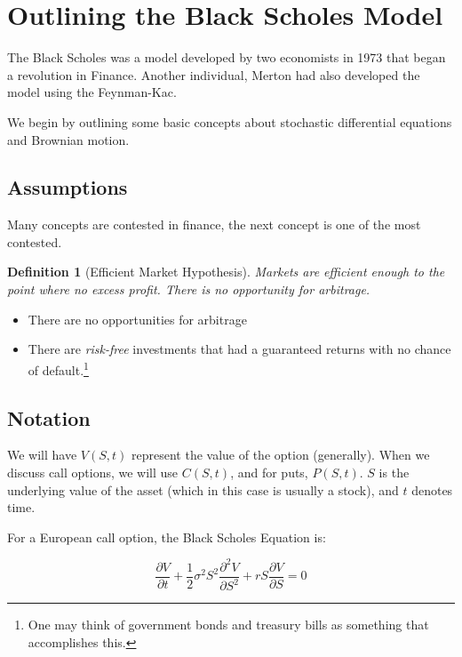 \documentclass{article}
\newtheorem{definition}{Definition}[section]
\begin{document}
\section{Outlining the Black Scholes Model}
The Black Scholes was a model developed by two economists in 1973 that began a revolution in Finance.
Another individual, Merton had also developed the model using the Feynman-Kac. 

We begin by outlining some basic concepts about stochastic differential equations and Brownian motion. 

\subsection*{Assumptions}
Many concepts are contested in finance, the next concept is one of the most contested.
\begin{definition}[Efficient Market Hypothesis]
    Markets are efficient enough to the point where no excess profit. There is no opportunity for arbitrage.
\end{definition}

\begin{itemize}
\item There are no opportunities for arbitrage
\item There are \emph{risk-free} investments that had a guaranteed returns with no chance of default.\footnote[1]{One may think of government bonds and treasury bills as something that accomplishes this.}
\end{itemize}


\subsection*{Notation}

We will have $V(S,t)$ represent the value of the option (generally). When we discuss call options, we will use $C(S,t)$, and for puts, $P(S,t)$.
$S$ is the underlying value of the asset (which in this case is usually a stock), and $t$ denotes time.

For a European call option, the Black Scholes Equation is:

\begin{equation}
    \frac{\partial V}{\partial t} + \frac{1}{2}\sigma^2S^2 \frac{\partial^2 V}{\partial S^2} + rS\frac{\partial V}{\partial S} = 0 
\end{equation}

\end{document}
